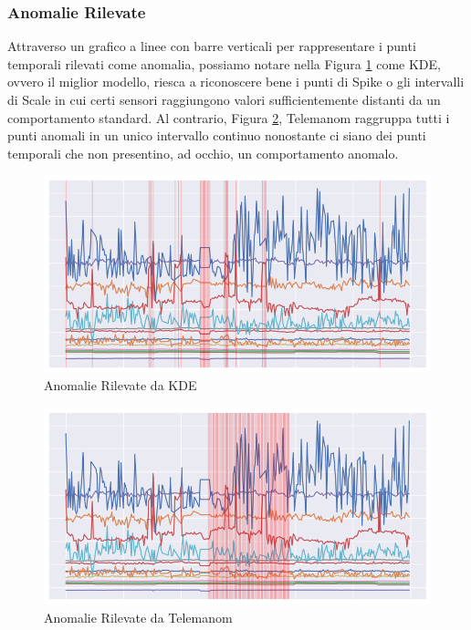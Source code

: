 \subsubsection{Anomalie Rilevate}
Attraverso un grafico a linee con barre verticali per rappresentare i punti temporali rilevati come anomalia, possiamo notare nella Figura \ref{kde} come KDE, ovvero il miglior modello, riesca a riconoscere bene i punti di Spike o gli intervalli di Scale in cui certi sensori raggiungono valori sufficientemente distanti da un comportamento standard. Al contrario, Figura \ref{worst_clf}, Telemanom raggruppa tutti i punti anomali in un unico intervallo continuo nonostante ci siano dei punti temporali che non presentino, ad occhio, un comportamento anomalo.

\begin{figure}[t]
	\centering
	\includegraphics[width=14cm, scale=1]{images/kde}
	\caption{Anomalie Rilevate da KDE}
	\label{kde}
	
\end{figure}

\begin{figure}[t]
	\centering
	\includegraphics[width=14cm, scale=1]{images/worst_clf}
	\caption{Anomalie Rilevate da Telemanom}
	\label{worst_clf}
	
\end{figure}

